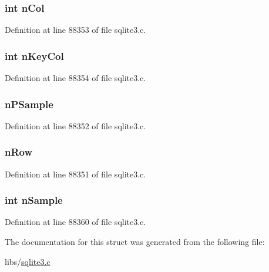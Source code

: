 \subsubsection[{n\+Col}]{\setlength{\rightskip}{0pt plus 5cm}int n\+Col}\label{struct_stat4_accum_a354f4c2d87e40ee3eab3758d0716280e}


Definition at line 88353 of file sqlite3.\+c.

\hypertarget{struct_stat4_accum_a04c2defb001c774592ca32aad5921050}{}
\subsubsection[{n\+Key\+Col}]{\setlength{\rightskip}{0pt plus 5cm}int n\+Key\+Col}\label{struct_stat4_accum_a04c2defb001c774592ca32aad5921050}


Definition at line 88354 of file sqlite3.\+c.

\hypertarget{struct_stat4_accum_af19753f3dc06f6bd4b3a0825cc90bf8d}{}
\subsubsection[{n\+P\+Sample}]{ n\+P\+Sample}\label{struct_stat4_accum_af19753f3dc06f6bd4b3a0825cc90bf8d}


Definition at line 88352 of file sqlite3.\+c.

\hypertarget{struct_stat4_accum_afd947c3e11387b7b825715b423b4d468}{}
\subsubsection[{n\+Row}]{ n\+Row}\label{struct_stat4_accum_afd947c3e11387b7b825715b423b4d468}


Definition at line 88351 of file sqlite3.\+c.

\hypertarget{struct_stat4_accum_ab53ecee268e3f1fea30aaf4587763fd9}{}
\subsubsection[{n\+Sample}]{\setlength{\rightskip}{0pt plus 5cm}int n\+Sample}\label{struct_stat4_accum_ab53ecee268e3f1fea30aaf4587763fd9}


Definition at line 88360 of file sqlite3.\+c.



The documentation for this struct was generated from the following file\+:\begin{DoxyCompactItemize}
\item 
libs/\hyperlink{sqlite3_8c}{sqlite3.\+c}\end{DoxyCompactItemize}
